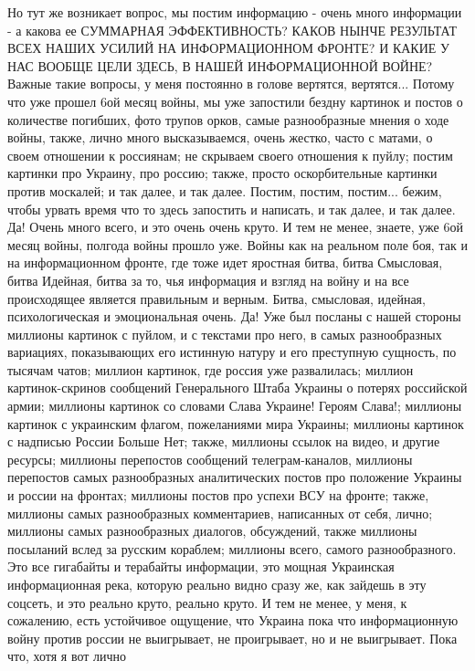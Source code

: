Но тут же возникает вопрос, мы постим информацию - очень много информации - а
какова ее СУММАРНАЯ ЭФФЕКТИВНОСТЬ? КАКОВ НЫНЧЕ РЕЗУЛЬТАТ ВСЕХ НАШИХ УСИЛИЙ НА
ИНФОРМАЦИОННОМ ФРОНТЕ? И КАКИЕ У НАС ВООБЩЕ ЦЕЛИ ЗДЕСЬ, В НАШЕЙ ИНФОРМАЦИОННОЙ
ВОЙНЕ?  Важные такие вопросы, у меня постоянно в голове вертятся, вертятся...
Потому что уже прошел 6ой месяц войны, мы уже запостили бездну картинок и
постов о количестве погибших, фото трупов орков, самые разнообразные мнения о
ходе войны, также, лично много высказываемся, очень жестко, часто с матами, о
своем отношении к россиянам;  не скрываем своего отношения к пуйлу; постим
картинки про Украину, про россию; также, просто оскорбительные картинки против
москалей; и так далее, и так далее.  Постим, постим, постим... бежим, чтобы
урвать время что то здесь запостить и написать, и так далее, и так далее.  Да!
Очень много всего, и это очень очень круто. И тем не менее, знаете, уже 6ой
месяц войны, полгода войны прошло уже. Войны как на реальном поле боя, так и на
информационном фронте, где тоже идет яростная битва, битва Смысловая, битва
Идейная, битва за то, чья информация и взгляд на войну и на все происходящее
является правильным и верным. Битва, смысловая, идейная, психологическая и
эмоциональная очень.  Да!  Уже был посланы с нашей стороны миллионы картинок с
пуйлом, и с текстами про него, в самых разнообразных вариациях, показывающих
его истинную натуру и его преступную сущность, по тысячам чатов; миллион
картинок, где россия уже развалилась; миллион картинок-скринов сообщений
Генерального Штаба Украины о потерях российской армии; миллионы картинок со
словами Слава Украине! Героям Слава!; миллионы картинок с украинским флагом,
пожеланиями мира Украины; миллионы картинок с надписью России Больше Нет;
также, миллионы ссылок на видео, и другие ресурсы; миллионы перепостов
сообщений телеграм-каналов, миллионы перепостов самых разнообразных
аналитических постов про положение Украины и россии на фронтах; миллионы постов
про успехи ВСУ на фронте; также, миллионы самых разнообразных комментариев,
написанных от себя, лично; миллионы самых разнообразных диалогов, обсуждений,
также миллионы посыланий вслед за русским кораблем; миллионы всего, самого
разнообразного. Это все гигабайты и терабайты информации, это мощная Украинская
информационная река, которую реально видно сразу же, как зайдешь в эту соцсеть,
и это реально круто, реально круто. И тем не менее, у меня, к сожалению, есть
устойчивое ощущение, что Украина пока что информационную войну против россии не
выигрывает, не проигрывает, но и не выигрывает. Пока что, хотя я вот лично
